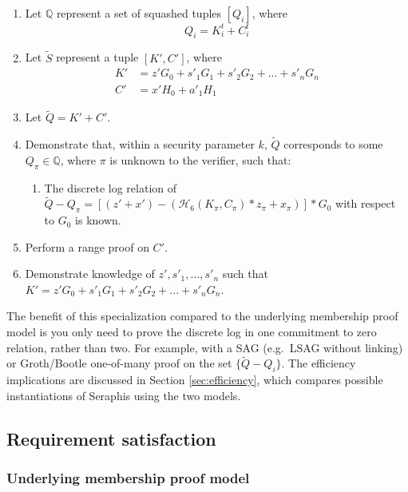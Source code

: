 \begin{appendices}
\begin{enumerate}
    \item Let $\mathbb{Q}$ represent a set of squashed tuples $[Q_i]$, where\vspace{.115cm}
    \[Q_i = K^t_i + C^t_i\]

    \item Let $\tilde{S}$ represent a tuple $[K', C']$, where\vspace{.115cm}
    \begin{align*}
        K' &= z' G_0 + s'_1 G_1 + s'_2 G_2 + ... + s'_n G_n \\
        C' &= x' H_0 + a'_1 H_1
    \end{align*}

    \item Let $\tilde{Q} = K' + C'$.

    \item Demonstrate that, within a security parameter $k$, $\tilde{Q}$ corresponds to some $Q_{\pi} \in \mathbb{Q}$, where $\pi$ is unknown to the verifier, such that:
    \begin{enumerate}
        \item The discrete log relation of $\tilde{Q} - Q_{\pi} = [(z' + x') - (\mathcal{H}_6(K_{\pi}, C_{\pi})*z_{\pi} + x_{\pi})]*G_0$ with respect to $G_0$ is known.
    \end{enumerate}

    \item Perform a range proof on $C'$.

    \item Demonstrate knowledge of $z', s'_1,...,s'_n$ such that $K' = z' G_0 + s'_1 G_1 + s'_2 G_2 + ... + s'_n G_n$.
\end{enumerate}

The benefit of this specialization compared to the underlying membership proof model is you only need to prove the discrete log in one commitment to zero relation, rather than two. For example, with a SAG (e.g.\ LSAG \cite{Liu2004} without linking) or Groth/Bootle one-of-many proof on the set $\{\tilde{Q} - Q_i\}$. The efficiency implications are discussed in Section \ref{sec:efficiency}, which compares possible instantiations of Seraphis using the two models.


\subsection{Requirement satisfaction}
\label{appendix:squashed-e-note-model-req-satisfaction}

\subsubsection{Underlying membership proof model}


\end{appendices}
